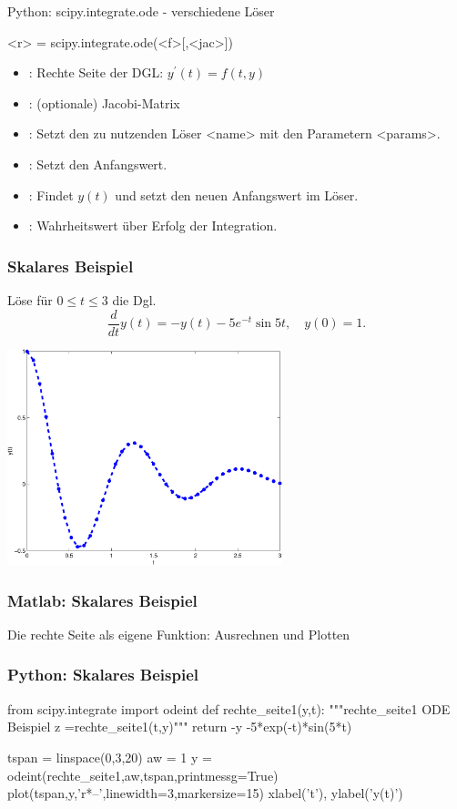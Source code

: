 \documentclass[hyperref={xetex}]{beamer}
\begin{document}
\begin{frame}[fragile]{Python: scipy.integrate.ode - verschiedene Löser}
  \begin{pyin}
<r> = scipy.integrate.ode(<f>[,<jac>])
  \end{pyin}
\begin{itemize}
  \item {}: Rechte Seite der DGL: $y^\prime(t) = f(t,y)$ 
  \item {}: (optionale)  Jacobi-Matrix
  \item {}: Setzt den zu nutzenden Löser <name> mit den Parametern <params>.
  \item {}: Setzt den Anfangswert.
  \item {}: Findet $y(t)$ und setzt den neuen Anfangswert im Löser.
  \item {}: Wahrheitswert über Erfolg der Integration. 
\end{itemize}
\end{frame}
%
%
\begin{frame}[fragile]\frametitle{Skalares Beispiel}
L\"ose f\"ur $0 \leq t \leq 3$ die Dgl.
\alert{ \[ \frac{d}{dt} y(t) = -y(t)-5e^{-t}\sin5t, \quad y(0)=1. \]}
\begin{center}
\includegraphics[width=0.6\textwidth]{./figures/loesung_dgl1} 
\end{center}
\end{frame}

%
%
\begin{frame}[fragile]\frametitle{Matlab: Skalares Beispiel}
Die rechte Seite als eigene Funktion:
Ausrechnen und Plotten
\end{frame}

%
%
\begin{frame}[fragile]\frametitle{Python: Skalares Beispiel}
  \begin{pyin}
from scipy.integrate import odeint
def rechte_seite1(y,t):
    """rechte_seite1   ODE Beispiel
       z  =rechte_seite1(t,y)"""
    return -y -5*exp(-t)*sin(5*t)

tspan =  linspace(0,3,20)
aw = 1
y = odeint(rechte_seite1,aw,tspan,printmessg=True)
plot(tspan,y,'r*--',linewidth=3,markersize=15)
xlabel('t'), ylabel('y(t)')    
  \end{pyin}
\end{frame}
\end{document}
